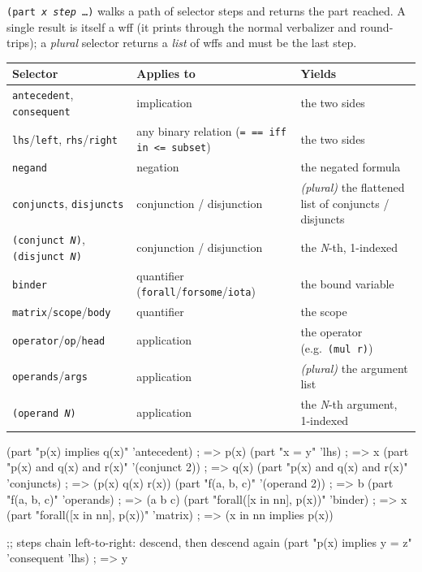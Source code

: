 \texttt{(part \textit{x} \textit{step} \ldots)} walks a path of selector
steps and returns the part reached.  A single result is itself a wff (it
prints through the normal verbalizer and round-trips); a \emph{plural}
selector returns a \emph{list} of wffs and must be the last step.

\begin{center}
\footnotesize
\begin{tabular}{@{}llp{6.0cm}@{}}
\toprule
Selector & Applies to & Yields \\
\midrule
\texttt{antecedent}, \texttt{consequent} & implication & the two sides \\[2pt]
\texttt{lhs}/\texttt{left}, \texttt{rhs}/\texttt{right} & any binary relation (\texttt{= == iff in <= subset}) & the two sides \\[2pt]
\texttt{negand} & negation & the negated formula \\[2pt]
\texttt{conjuncts}, \texttt{disjuncts} & conjunction / disjunction & \emph{(plural)} the flattened list of conjuncts / disjuncts \\[2pt]
\texttt{(conjunct \textit{N})}, \texttt{(disjunct \textit{N})} & conjunction / disjunction & the \textit{N}-th, 1-indexed \\[2pt]
\texttt{binder} & quantifier (\texttt{forall}/\texttt{forsome}/\texttt{iota}) & the bound variable \\[2pt]
\texttt{matrix}/\texttt{scope}/\texttt{body} & quantifier & the scope \\[2pt]
\texttt{operator}/\texttt{op}/\texttt{head} & application & the operator (e.g.\ \texttt{(mul r)}) \\[2pt]
\texttt{operands}/\texttt{args} & application & \emph{(plural)} the argument list \\[2pt]
\texttt{(operand \textit{N})} & application & the \textit{N}-th argument, 1-indexed \\
\bottomrule
\end{tabular}
\end{center}

\begin{VNBsnip}
(part "p(x) implies q(x)" 'antecedent)         ; => p(x)
(part "x = y" 'lhs)                            ; => x
(part "p(x) and q(x) and r(x)" '(conjunct 2))  ; => q(x)
(part "p(x) and q(x) and r(x)" 'conjuncts)     ; => (p(x) q(x) r(x))
(part "f(a, b, c)" '(operand 2))               ; => b
(part "f(a, b, c)" 'operands)                  ; => (a b c)
(part "forall([x in nn], p(x))" 'binder)       ; => x
(part "forall([x in nn], p(x))" 'matrix)       ; => (x in nn implies p(x))

;; steps chain left-to-right: descend, then descend again
(part "p(x) implies y = z" 'consequent 'lhs)   ; => y
\end{VNBsnip}

